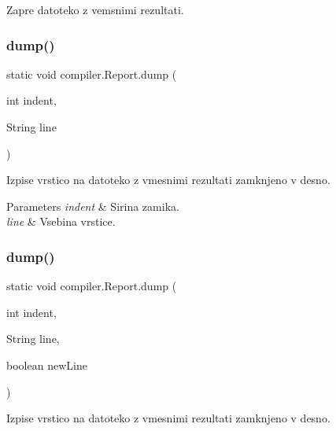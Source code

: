 Zapre datoteko z vemsnimi rezultati. \mbox{\label{classcompiler_1_1_report_aaf3b3d2a725b3971cbafbedf87f6aae8}} 
\subsubsection{\texorpdfstring{dump()}{dump()}\hspace{0.1cm}{\footnotesize\ttfamily [1/2]}}
{\footnotesize\ttfamily static void compiler.\+Report.\+dump (\begin{DoxyParamCaption}\item[{int}]{indent,  }\item[{String}]{line }\end{DoxyParamCaption})\hspace{0.3cm}{\ttfamily [static]}}

Izpise vrstico na datoteko z vmesnimi rezultati zamknjeno v desno.


\begin{DoxyParams}{Parameters}
{\em indent} & Sirina zamika. \\
\hline
{\em line} & Vsebina vrstice. \\
\hline
\end{DoxyParams}
\mbox{\label{classcompiler_1_1_report_a84d964f5534f33b9941dc076a2850080}} 
\subsubsection{\texorpdfstring{dump()}{dump()}\hspace{0.1cm}{\footnotesize\ttfamily [2/2]}}
{\footnotesize\ttfamily static void compiler.\+Report.\+dump (\begin{DoxyParamCaption}\item[{int}]{indent,  }\item[{String}]{line,  }\item[{boolean}]{new\+Line }\end{DoxyParamCaption})\hspace{0.3cm}{\ttfamily [static]}}

Izpise vrstico na datoteko z vmesnimi rezultati zamknjeno v desno.


